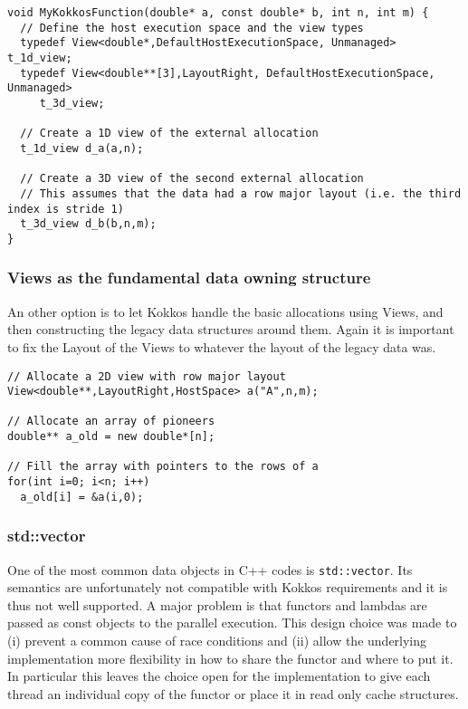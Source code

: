  \begin{lstlisting}
void MyKokkosFunction(double* a, const double* b, int n, int m) {
  // Define the host execution space and the view types
  typedef View<double*,DefaultHostExecutionSpace, Unmanaged> t_1d_view;
  typedef View<double**[3],LayoutRight, DefaultHostExecutionSpace, Unmanaged> 
     t_3d_view;
  
  // Create a 1D view of the external allocation
  t_1d_view d_a(a,n);
 
  // Create a 3D view of the second external allocation
  // This assumes that the data had a row major layout (i.e. the third index is stride 1)
  t_3d_view d_b(b,n,m);
}
\end{lstlisting}

\subsubsection{Views as the fundamental data owning structure}

An other option is to let Kokkos handle the basic allocations using Views, 
and then constructing the legacy data structures around them. Again it is
important to fix the Layout of the Views to whatever the layout of the legacy 
data was. 

\begin{lstlisting}
// Allocate a 2D view with row major layout
View<double**,LayoutRight,HostSpace> a("A",n,m);

// Allocate an array of pioneers
double** a_old = new double*[n];

// Fill the array with pointers to the rows of a
for(int i=0; i<n; i++)
  a_old[i] = &a(i,0);
\end{lstlisting}

\subsubsection{std::vector}

One of the most common data objects in C++ codes is \lstinline|std::vector|. 
Its semantics are unfortunately not compatible with Kokkos requirements 
and it is thus not well supported. A major problem is that functors and lambdas
are passed as const objects to the parallel execution. This design choice was made
to (i) prevent a common cause of race conditions and (ii) allow the underlying 
implementation more flexibility in how to share the functor and where to put it.
In particular this leaves the choice open for the implementation to give each thread 
an individual copy of the functor or place it in read only cache structures.

